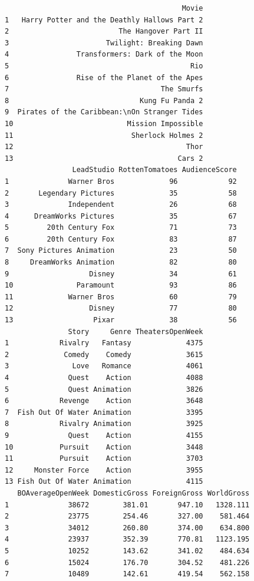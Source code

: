 \documentclass[
]{book}
\begin{document}
\begin{verbatim}
                                          Movie
1   Harry Potter and the Deathly Hallows Part 2
2                          The Hangover Part II
3                       Twilight: Breaking Dawn
4                Transformers: Dark of the Moon
5                                           Rio
6                Rise of the Planet of the Apes
7                                    The Smurfs
8                               Kung Fu Panda 2
9  Pirates of the Caribbean:\nOn Stranger Tides
10                           Mission Impossible
11                            Sherlock Holmes 2
12                                         Thor
13                                       Cars 2
                LeadStudio RottenTomatoes AudienceScore
1              Warner Bros             96            92
2       Legendary Pictures             35            58
3              Independent             26            68
4      DreamWorks Pictures             35            67
5         20th Century Fox             71            73
6         20th Century Fox             83            87
7  Sony Pictures Animation             23            50
8     DreamWorks Animation             82            80
9                   Disney             34            61
10               Paramount             93            86
11             Warner Bros             60            79
12                  Disney             77            80
13                   Pixar             38            56
               Story     Genre TheatersOpenWeek
1            Rivalry   Fantasy             4375
2             Comedy    Comedy             3615
3               Love   Romance             4061
4              Quest    Action             4088
5              Quest Animation             3826
6            Revenge    Action             3648
7  Fish Out Of Water Animation             3395
8            Rivalry Animation             3925
9              Quest    Action             4155
10           Pursuit    Action             3448
11           Pursuit    Action             3703
12     Monster Force    Action             3955
13 Fish Out Of Water Animation             4115
   BOAverageOpenWeek DomesticGross ForeignGross WorldGross
1              38672        381.01       947.10   1328.111
2              23775        254.46       327.00    581.464
3              34012        260.80       374.00    634.800
4              23937        352.39       770.81   1123.195
5              10252        143.62       341.02    484.634
6              15024        176.70       304.52    481.226
7              10489        142.61       419.54    562.158

\end{verbatim}
\end{document}

